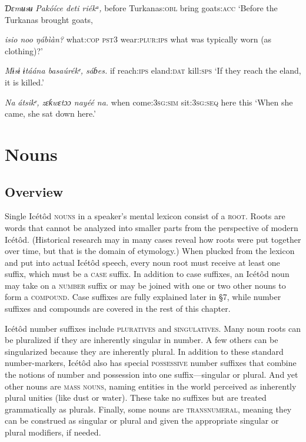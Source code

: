 \textit{Ɗ}\textit{ɛmʉsʉ}\textit{   Pakóíce     deti   riékᵃ,}
before   Turkanas:\textsc{obl}   bring   goats:\textsc{acc}
‘Before the Turkanas brought goats,



\textit{isio     noo   ŋábìàn?}
what:\textsc{cop}   \textsc{pst3}   wear:\textsc{plur:ips}
what was typically worn (as clothing)?’




\textit{Mɨsɨ}\textit{   ɨtáána   basaúrékᵉ,   sáɓes.}
if   reach:\textsc{ips}   eland:\textsc{dat}   kill:\textsc{sps}
‘If they reach the eland, it is killed.’




\textit{Na}\textit{   átsikᵉ,       zɛƙwɛtɔɔ   nayéé   na.}
when   come:\textsc{3sg:sim}   sit:\textsc{3sg:seq}   here   this
‘When she came, she sat down here.’




\section{Nouns}



\subsection{Overview}


Single Icétôd \textsc{nouns} in a speaker’s mental lexicon consist of a \textsc{root.} Roots are words that cannot be analyzed into smaller parts from the perspective of modern Icétôd. (Historical research may in many cases reveal how roots were put together over time, but that is the domain of etymology.) When plucked from the lexicon and put into actual Icétôd speech, every noun root must receive at least one suffix, which must be a \textsc{case }suffix. In addition to case suffixes, an Icétôd noun may take on a \textsc{number} suffix or may be joined with one or two other nouns to form a \textsc{compound}. Case suffixes are fully explained later in §7, while number suffixes and compounds are covered in the rest of this chapter.

Icétôd number suffixes include \textsc{pluratives} and \textsc{singulatives}. Many noun roots can be pluralized if they are inherently singular in number. A few others can be singularized because they are inherently plural. In addition to these standard number-markers, Icétôd also has special \textsc{possessive} number suffixes that combine the notions of number and possession into one suffix—singular or plural. And yet other nouns are \textsc{mass} \textsc{nouns}, naming entities in the world perceived as inherently plural unities (like dust or water). These take no suffixes but are treated grammatically as plurals. Finally, some nouns are \textsc{transnumeral}, meaning they can be construed as singular or plural and given the appropriate singular or plural modifiers, if needed. 

